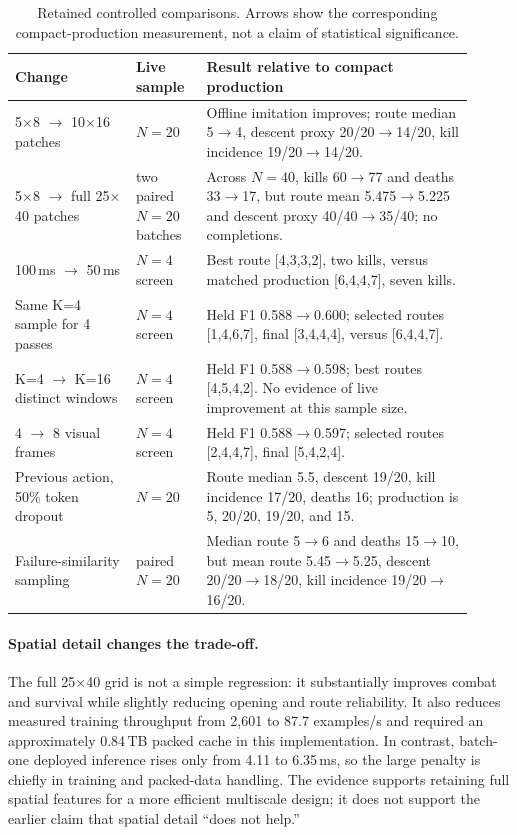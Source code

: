 \documentclass[11pt]{article}
\newcommand{\x}{\ensuremath{\times}}
\begin{document}
\begin{table}[ht]
\centering
\footnotesize
\setlength{\tabcolsep}{3.5pt}
\begin{tabular}{p{0.24\linewidth}p{0.14\linewidth}p{0.53\linewidth}}
\toprule
Change & Live sample & Result relative to compact production \\
\midrule
5\x8 $\to$ 10\x16 patches & $N{=}20$ & Offline imitation improves; route median 5$\to$4, descent proxy 20/20$\to$14/20, kill incidence 19/20$\to$14/20. \\
5\x8 $\to$ full 25\x40 patches & two paired $N{=}20$ batches & Across $N{=}40$, kills 60$\to$77 and deaths 33$\to$17, but route mean 5.475$\to$5.225 and descent proxy 40/40$\to$35/40; no completions. \\
100\,ms $\to$ 50\,ms & $N{=}4$ screen & Best route [4,3,3,2], two kills, versus matched production [6,4,4,7], seven kills. \\
Same K=4 sample for 4 passes & $N{=}4$ screen & Held F1 0.588$\to$0.600; selected routes [1,4,6,7], final [3,4,4,4], versus [6,4,4,7]. \\
K=4 $\to$ K=16 distinct windows & $N{=}4$ screen & Held F1 0.588$\to$0.598; best routes [4,5,4,2]. No evidence of live improvement at this sample size. \\
4 $\to$ 8 visual frames & $N{=}4$ screen & Held F1 0.588$\to$0.597; selected routes [2,4,4,7], final [5,4,2,4]. \\
Previous action, 50\% token dropout & $N{=}20$ & Route median 5.5, descent 19/20, kill incidence 17/20, deaths 16; production is 5, 20/20, 19/20, and 15. \\
Failure-similarity sampling & paired $N{=}20$ & Median route 5$\to$6 and deaths 15$\to$10, but mean route 5.45$\to$5.25, descent 20/20$\to$18/20, kill incidence 19/20$\to$16/20. \\
\bottomrule
\end{tabular}
\caption{Retained controlled comparisons. Arrows show the corresponding compact-production measurement, not a claim of statistical significance.}
\label{tab:negative}
\end{table}

\paragraph{Spatial detail changes the trade-off.} The full 25\x40 grid is not a simple regression: it substantially improves combat and survival while slightly reducing opening and route reliability. It also reduces measured training throughput from 2{,}601 to 87.7 examples/s and required an approximately 0.84\,TB packed cache in this implementation. In contrast, batch-one deployed inference rises only from 4.11 to 6.35\,ms, so the large penalty is chiefly in training and packed-data handling. The evidence supports retaining full spatial features for a more efficient multiscale design; it does not support the earlier claim that spatial detail ``does not help.''
\end{document}
